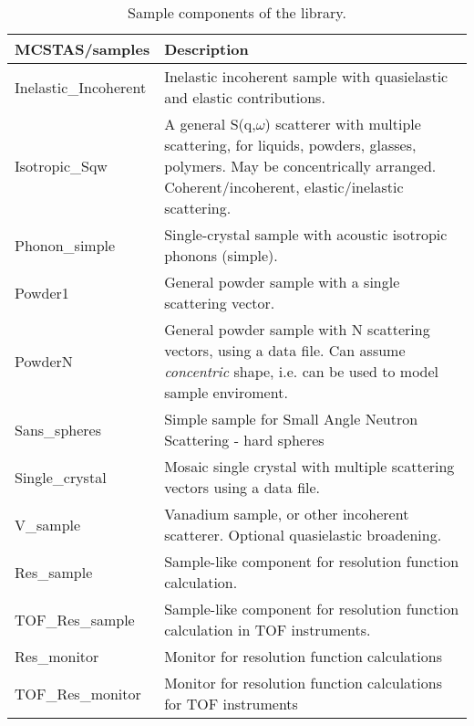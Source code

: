 \begin{table}
  \begin{center}
    {\let\my=\\
    \begin{tabular}{|p{}|p{}|}
      \hline
       \textbf{MCSTAS/samples} & Description \\
       \hline
  Inelastic\_Incoherent & Inelastic incoherent sample with quasielastic and elastic contributions. \\
  Isotropic\_Sqw & A general S(q,$\omega$) scatterer with multiple scattering, for liquids, powders, glasses, polymers. May be concentrically arranged. Coherent/incoherent, elastic/inelastic scattering. \\
  Phonon\_simple   & Single-crystal sample with acoustic isotropic phonons (simple). \\
  Powder1      &  General powder sample with a single
                scattering vector. \\
  PowderN      &  General powder sample with N
                scattering vectors, using a data file. Can assume \emph{concentric} shape,
		i.e. can be used to model sample enviroment.\\
  Sans\_spheres  & Simple sample for Small Angle Neutron Scattering - hard spheres \\
  Single\_crystal & Mosaic single crystal with multiple scattering vectors
                    using a data file. \\
  V\_sample      & Vanadium sample, or other incoherent
  scatterer. Optional quasielastic broadening.\\ \hline

    Res\_sample   & Sample-like component for resolution function calculation. \\
  TOF\_Res\_sample   & Sample-like component for resolution function calculation in TOF instruments. \\
Res\_monitor      &   Monitor for resolution function calculations \\
TOF\_Res\_monitor      &   Monitor for resolution function calculations
                        for TOF instruments \\ \hline
    \end{tabular}
    \caption{Sample components of the \MCS library.}
    \label{t:comp-samples}
    }
  \end{center}
\end{table}

